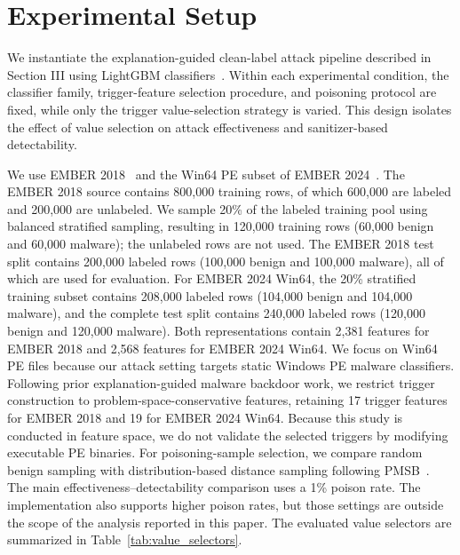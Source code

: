 \section{Experimental Setup}
We instantiate the explanation-guided clean-label attack pipeline described in Section III using LightGBM classifiers~\cite{lightgbm}.
Within each experimental condition, the classifier family, trigger-feature selection procedure, and poisoning protocol are fixed, while only the trigger value-selection strategy is varied.
This design isolates the effect of value selection on attack effectiveness and sanitizer-based detectability.

We use EMBER 2018~\cite{ember2018} and the Win64 PE subset of EMBER 2024~\cite{ember2024}.
The EMBER 2018 source contains 800,000 training rows, of which 600,000 are labeled and 200,000 are unlabeled.
We sample 20\% of the labeled training pool using balanced stratified sampling, resulting in 120,000 training rows (60,000 benign and 60,000 malware); the unlabeled rows are not used.
The EMBER 2018 test split contains 200,000 labeled rows (100,000 benign and 100,000 malware), all of which are used for evaluation.
For EMBER 2024 Win64, the 20\% stratified training subset contains 208,000 labeled rows (104,000 benign and 104,000 malware), and the complete test split contains 240,000 labeled rows (120,000 benign and 120,000 malware).
Both representations contain 2,381 features for EMBER 2018 and 2,568 features for EMBER 2024 Win64.
We focus on Win64 PE files because our attack setting targets static Windows PE malware classifiers.
Following prior explanation-guided malware backdoor work, we restrict trigger construction to problem-space-conservative features, retaining 17 trigger features for EMBER 2018 and 19 for EMBER 2024 Win64.
Because this study is conducted in feature space, we do not validate the selected triggers by modifying executable PE binaries.
For poisoning-sample selection, we compare random benign sampling with distribution-based distance sampling following PMSB~\cite{pmsb}.
The main effectiveness--detectability comparison uses a 1\% poison rate.
The implementation also supports higher poison rates, but those settings are outside the scope of the analysis reported in this paper.
The evaluated value selectors are summarized in Table~\ref{tab:value_selectors}.

